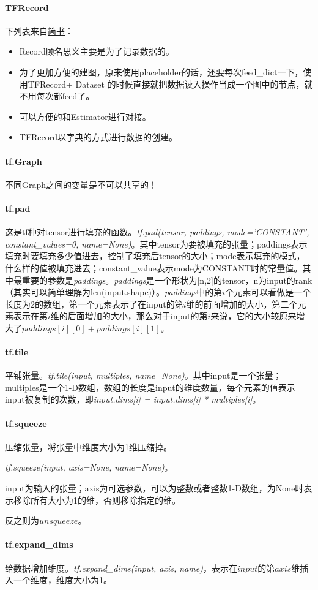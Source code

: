 \paragraph{TFRecord}
下列表来自\href{https://www.jianshu.com/p/72596a8488c3}{简书}：
\begin{itemize}
	\item Record顾名思义主要是为了记录数据的。
	\item 为了更加方便的建图，原来使用placeholder的话，还要每次feed\_dict一下，使用TFRecord+ Dataset 的时候直接就把数据读入操作当成一个图中的节点，就不用每次都feed了。
	\item 可以方便的和Estimator进行对接。
	\item TFRecord以字典的方式进行数据的创建。
\end{itemize}

\paragraph{tf.Graph}
不同Graph之间的变量是不可以共享的！


\paragraph{tf.pad}
这是tf种对tensor进行填充的函数。\textit{tf.pad(tensor, paddings, mode='CONSTANT', constant\_values=0, name=None)}。其中tensor为要被填充的张量；paddings表示填充时要填充多少值进去，控制了填充后tensor的大小；mode表示填充的模式，什么样的值被填充进去；constant\_value表示mode为CONSTANT时的常量值。其中最重要的参数是\textit{paddings}。\textit{paddings}是一个形状为[n,2]的tensor，n为input的rank（其实可以简单理解为len(input.shape)）。\textit{paddings}中的第$i$个元素可以看做是一个长度为2的数组，第一个元素表示了在input的第$i$维的前面增加的大小，第二个元素表示在第$i$维的后面增加的大小，那么对于input的第$i$来说，它的大小较原来增大了$paddings[i][0]+paddings[i][1]$。

\paragraph{tf.tile}平铺张量。\textit{tf.tile(input, multiples, name=None)}。其中input是一个张量；multiples是一个1-D数组，数组的长度是input的维度数量，每个元素的值表示input被复制的次数，即\textit{input.dims[i] = input.dims[i] * multiples[i]}。

\paragraph{tf.squeeze}压缩张量，将张量中维度大小为1维压缩掉。

\textit{tf.squeeze(input, axis=None, name=None)}。

input为输入的张量；axis为可选参数，可以为整数或者整数1-D数组，为None时表示移除所有大小为1的维，否则移除指定的维。

反之则为$unsqueeze$。

\paragraph{tf.expand_dims}给数据增加维度。\textit{tf.expand\_dims(input, axis, name)}，表示在$input$的第$axis$维插入一个维度，维度大小为1。

